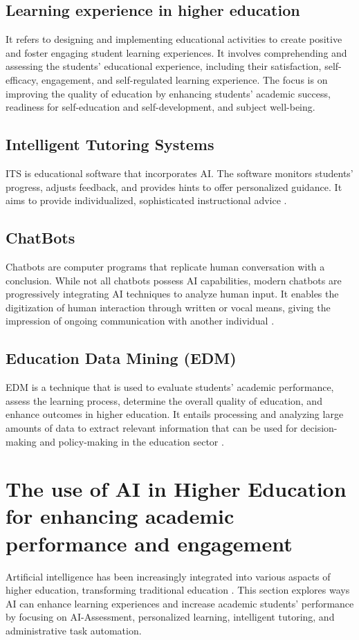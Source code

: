 \subsection{Learning experience in higher education}
It refers to designing and implementing educational activities to create positive
and foster engaging student learning experiences\citep{kang_supporting_2023}.
It involves comprehending and assessing the students’ educational experience, including their satisfaction,
self-efficacy, engagement, and self-regulated learning experience\citep{lyz_students_2022}.
The focus is on improving the quality of education by enhancing students’ academic success,
readiness for self-education and self-development, and subject well-being\citep{iordache-platis_building_2018}.
\subsection{Intelligent Tutoring Systems}
ITS is educational software that incorporates AI. The software monitors students’ progress,
adjusts feedback, and provides hints to offer personalized guidance\citep{shute_intelligent_2010}. It aims to provide individualized, sophisticated instructional advice
\citep{sedlmeier_intelligent_2001}.
\subsection{ ChatBots }
Chatbots are computer programs that replicate human conversation with a conclusion.
While not all chatbots possess AI capabilities, modern chatbots are progressively
integrating AI techniques to analyze human input\citep{IBM_withnodate}.
It enables the digitization of human interaction through written or vocal means,
giving the impression of ongoing communication with another individual \citep{oracle_what_nodate}.
\subsection{Education Data Mining (EDM)}
EDM is a technique that is used to evaluate students' academic performance,
assess the learning process, determine the overall quality of education, and enhance outcomes in higher education.
It entails processing and analyzing large amounts of data to extract relevant information that can be used for
decision-making and policy-making in the education sector \citep{arifin_using_2022}.

\section{The use of AI in Higher Education for enhancing academic performance and engagement }
\justifying
Artificial intelligence has been increasingly integrated into various aspacts of higher
education, transforming traditional education \citep{wang_exploring_2023}.  This section explores ways
AI can enhance learning experiences and increase academic students' performance by focusing on AI-Assessment,
personalized learning, intelligent tutoring, and administrative task automation.
